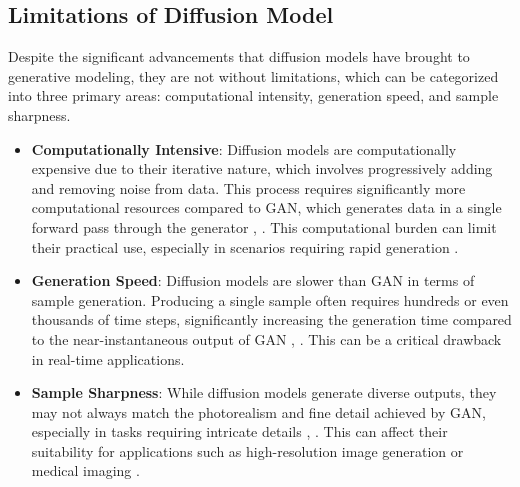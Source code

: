 \subsection{Limitations of Diffusion Model}

Despite the significant advancements that diffusion models have brought to generative modeling, they are not without limitations, which can be categorized into three primary areas: computational intensity, generation speed, and sample sharpness.

\begin{itemize}
    \item \textbf{Computationally Intensive}: Diffusion models are computationally expensive due to their iterative nature, which involves progressively adding and removing noise from data. This process requires significantly more computational resources compared to GAN, which generates data in a single forward pass through the generator \citep{10.1109/msp.2017.2765202}, \citep{10.1145/3422622}. This computational burden can limit their practical use, especially in scenarios requiring rapid generation \citep{10.48550/arxiv.2211.07804}.
    
    \item \textbf{Generation Speed}: Diffusion models are slower than GAN in terms of sample generation. Producing a single sample often requires hundreds or even thousands of time steps, significantly increasing the generation time compared to the near-instantaneous output of GAN \citep{10.48550/arxiv.2011.13456}, \citep{10.48550/arxiv.2010.02502}. This can be a critical drawback in real-time applications.
    
    \item \textbf{Sample Sharpness}: While diffusion models generate diverse outputs, they may not always match the photorealism and fine detail achieved by GAN, especially in tasks requiring intricate details \citep{10.48550/arxiv.2105.05233}, \citep{10.1109/cvpr52688.2022.01117}. This can affect their suitability for applications such as high-resolution image generation or medical imaging \citep{10.48550/arxiv.2211.07804}.
\end{itemize}